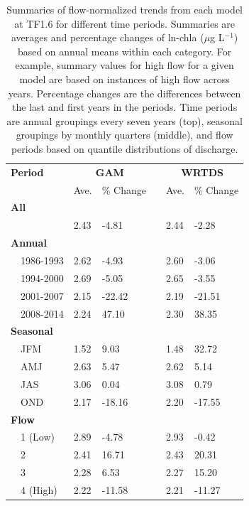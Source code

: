 \documentclass{svjour3}\usepackage[]{graphicx}\usepackage[]{color}
\newcommand{\mugl}{$\mu$g L$^{-1}$}
\begin{document}
\begin{table}[!tbp]
\caption{Summaries of flow-normalized trends from each model at TF1.6 for different time periods.  Summaries are averages and percentage changes of ln-\ac{chla} (\mugl) based on annual means within each category.  For example, summary values for high flow for a given model are based on instances of high flow across years.  Percentage changes are the differences between the last and first years in the periods.  Time periods are annual groupings every seven years (top), seasonal groupings by monthly quarters (middle), and flow periods based on quantile distributions of discharge.\label{tab:trendsTF16}} 
\begin{center}
\begin{tabular}{lllcll}
\hline\hline
\multicolumn{1}{l}{\bfseries Period}&\multicolumn{2}{c}{\bfseries GAM}&\multicolumn{1}{c}{\bfseries }&\multicolumn{2}{c}{\bfseries WRTDS}\tabularnewline
\cline{2-3} \cline{5-6}
\multicolumn{1}{l}{}&\multicolumn{1}{c}{Ave.}&\multicolumn{1}{c}{\% Change}&\multicolumn{1}{c}{}&\multicolumn{1}{c}{Ave.}&\multicolumn{1}{c}{\% Change}\tabularnewline
\hline
{\bfseries All}&&&&&\tabularnewline
~~&2.43& -4.81&&2.44& -2.28\tabularnewline
\hline
{\bfseries Annual}&&&&&\tabularnewline
~~1986-1993&2.62& -4.93&&2.60& -3.06\tabularnewline
~~1994-2000&2.69& -5.05&&2.65& -3.55\tabularnewline
~~2001-2007&2.15&-22.42&&2.19&-21.51\tabularnewline
~~2008-2014&2.24& 47.10&&2.30& 38.35\tabularnewline
\hline
{\bfseries Seasonal}&&&&&\tabularnewline
~~JFM&1.52&  9.03&&1.48& 32.72\tabularnewline
~~AMJ&2.63&  5.47&&2.62&  5.14\tabularnewline
~~JAS&3.06&  0.04&&3.08&  0.79\tabularnewline
~~OND&2.17&-18.16&&2.20&-17.55\tabularnewline
\hline
{\bfseries Flow}&&&&&\tabularnewline
~~1 (Low)&2.89& -4.78&&2.93& -0.42\tabularnewline
~~2&2.41& 16.71&&2.43& 20.31\tabularnewline
~~3&2.28&  6.53&&2.27& 15.20\tabularnewline
~~4 (High)&2.22&-11.58&&2.21&-11.27\tabularnewline
\hline
\end{tabular}\end{center}

\end{table}
\end{document}
